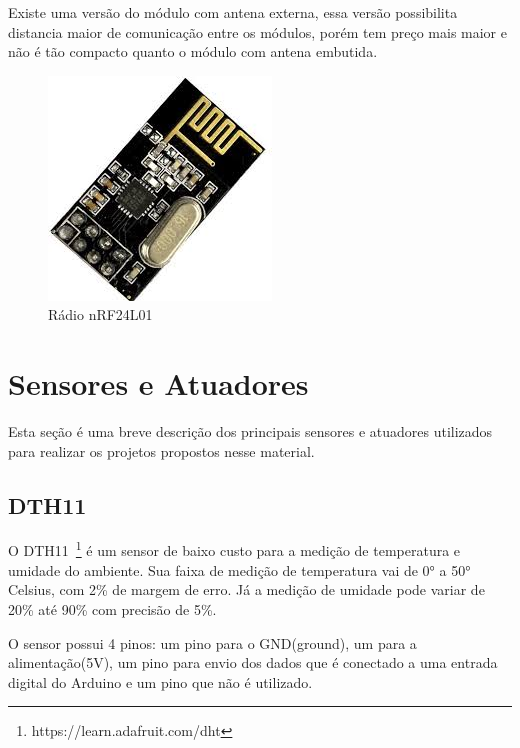 Existe uma versão do módulo com antena externa, essa versão possibilita distancia maior de comunicação entre os módulos, porém tem preço mais maior e não é tão compacto quanto o módulo com antena embutida. 

\begin{figure}[ht]
      \centering
      \includegraphics[scale=0.30]{figuras/nrf24l01.jpg}
      \caption{Rádio nRF24L01}
      \label{fig:nRF24L01}
\end{figure}



\section{Sensores e Atuadores}

Esta seção é uma breve descrição dos principais sensores e atuadores utilizados para realizar os projetos propostos nesse material.  

\subsection{DTH11}

O DTH11~\footnote{https://learn.adafruit.com/dht} é um sensor de baixo custo para a medição de temperatura e umidade do ambiente. Sua faixa de medição de temperatura vai de 0° a 50° Celsius, com 2\% de margem de erro. Já a medição de umidade pode variar de 20\% até 90\% com precisão de 5\%.

O sensor possui 4 pinos: um pino para o GND(ground), um para a alimentação(5V), um pino para envio dos dados que é conectado a uma entrada digital do Arduino e um pino que não é utilizado.

